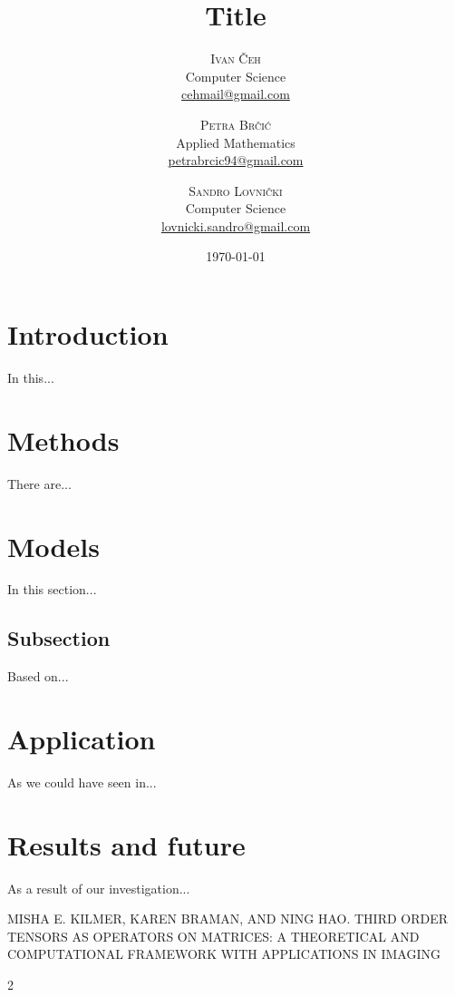 \documentclass[twoside]{article}
\title{Title} %
\author{%
\textsc{Ivan \v{C}eh}\\%
\normalsize Computer Science \\
\normalsize \href{mailto:cehmail@gmail.com}{cehmail@gmail.com} 
\and
\textsc{Petra Br\v{c}i\'c}\\%
\normalsize Applied Mathematics \\
\normalsize \href{mailto:petrabrcic94@gmail.com}{petrabrcic94@gmail.com} 
\and
\textsc{Sandro Lovni\v{c}ki}\\%
\normalsize Computer Science \\ 
\normalsize \href{mailto:lovnicki.sandro@gmail.com}{lovnicki.sandro@gmail.com}
}
\date{\today}
\begin{document}
\maketitle

\begin{multicols}{2}

\section{Introduction}
In this...

\section{Methods}
There are...



\section{Models}
In this section...

\subsection{Subsection}
Based on...


\section{Application}
As we could have seen in...



\section{Results and future}
As a result of our investigation...



\begin{thebibliography}{99}

MISHA E. KILMER, KAREN BRAMAN, AND NING HAO.
\newblock THIRD ORDER TENSORS AS OPERATORS ON MATRICES: A
THEORETICAL AND COMPUTATIONAL FRAMEWORK WITH
APPLICATIONS IN IMAGING
 
\end{thebibliography}


\end{multicols}{2}
\end{document}
